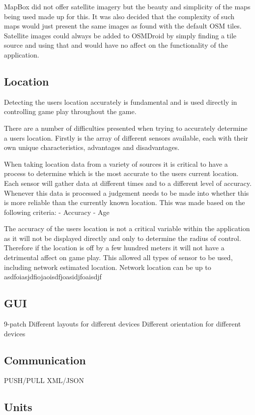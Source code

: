 MapBox did not offer satellite imagery but the beauty and simplicity of the maps being used made up for this. It was also decided that the complexity of such maps would just present the same images as found with the default OSM tiles. Satellite images could always be added to OSMDroid by simply finding a tile source and using that and would have no affect on the functionality of the application. 


\subsection{Location}
Detecting the users location accurately is fundamental and is used directly in controlling game play throughout the game.

There are a number of difficulties presented when trying to accurately determine a users location. Firstly is the array of different sensors available, each with their own unique characteristics, advantages and disadvantages.

When taking location data from a variety of sources it is critical to have a process to determine which is the most accurate to the users current location. Each sensor will gather data at different times and to a different level of accuracy. Whenever this data is processed a judgement needs to be made into whether this is more reliable than the currently known location. This was made based on the following criteria:
- Accuracy
- Age

The accuracy of the users location is not a critical variable within the application as it will not be displayed directly and only to determine the radius of control. Therefore if the location is off by a few hundred meters it will not have a detrimental affect on game play. This allowed all types of sensor to be used, including network estimated location. Network location can be up to asdfoiasjdfiojaoisdfjoasidjfoaisdjf


\subsection{GUI}
9-patch
Different layouts for different devices
Different orientation for different devices


\subsection{Communication}
PUSH/PULL
XML/JSON

\subsection{Units}



